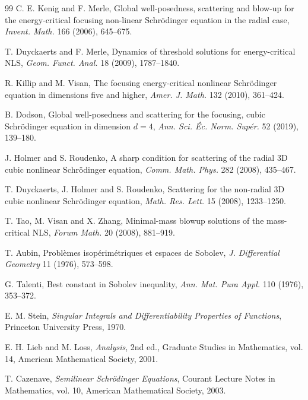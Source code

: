 \documentclass[preprint,12pt]{elsarticle}
\numberwithin{equation}{section}
\theoremstyle{remark}
\begin{document}
\begin{thebibliography}{99}
C. E. Kenig and F. Merle,
\newblock Global well-posedness, scattering and blow-up for the energy-critical focusing non-linear Schr\"odinger equation in the radial case,
\newblock \emph{Invent. Math.} 166 (2006), 645--675.

T. Duyckaerts and F. Merle,
\newblock Dynamics of threshold solutions for energy-critical NLS,
\newblock \emph{Geom. Funct. Anal.} 18 (2009), 1787--1840.

R. Killip and M. Visan,
\newblock The focusing energy-critical nonlinear Schr\"odinger equation in dimensions five and higher,
\newblock \emph{Amer. J. Math.} 132 (2010), 361--424.

B. Dodson,
\newblock Global well-posedness and scattering for the focusing, cubic Schr\"odinger equation in dimension $d=4$,
\newblock \emph{Ann. Sci. \'Ec. Norm. Sup\'er.} 52 (2019), 139--180.

J. Holmer and S. Roudenko,
\newblock A sharp condition for scattering of the radial 3D cubic nonlinear Schr\"odinger equation,
\newblock \emph{Comm. Math. Phys.} 282 (2008), 435--467.

T. Duyckaerts, J. Holmer and S. Roudenko,
\newblock Scattering for the non-radial 3D cubic nonlinear Schr\"odinger equation,
\newblock \emph{Math. Res. Lett.} 15 (2008), 1233--1250.

T. Tao, M. Visan and X. Zhang,
\newblock Minimal-mass blowup solutions of the mass-critical NLS,
\newblock \emph{Forum Math.} 20 (2008), 881--919.

T. Aubin,
\newblock Probl\`emes isop\'erim\'etriques et espaces de Sobolev,
\newblock \emph{J. Differential Geometry} 11 (1976), 573--598.

G. Talenti,
\newblock Best constant in Sobolev inequality,
\newblock \emph{Ann. Mat. Pura Appl.} 110 (1976), 353--372.

E. M. Stein,
\newblock \emph{Singular Integrals and Differentiability Properties of Functions},
\newblock Princeton University Press, 1970.

E. H. Lieb and M. Loss,
\newblock \emph{Analysis}, 2nd ed.,
\newblock Graduate Studies in Mathematics, vol. 14, American Mathematical Society, 2001.

T. Cazenave,
\newblock \emph{Semilinear Schr\"odinger Equations},
\newblock Courant Lecture Notes in Mathematics, vol. 10, American Mathematical Society, 2003.


\end{thebibliography}
\end{document}
